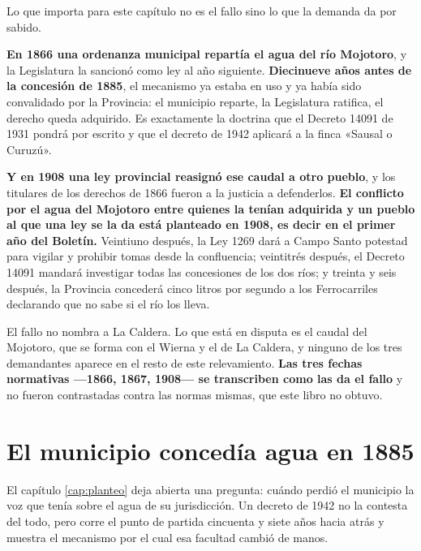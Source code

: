Lo que importa para este capítulo no es el fallo sino lo que la demanda da por sabido.

\textbf{En 1866 una ordenanza municipal repartía el agua del río Mojotoro}, y la Legislatura la
sancionó como ley al año siguiente. \textbf{Diecinueve años antes de la concesión de 1885}, el
mecanismo ya estaba en uso y ya había sido convalidado por la Provincia: el municipio reparte,
la Legislatura ratifica, el derecho queda adquirido. Es exactamente la doctrina que el Decreto
14091 de 1931 pondrá por escrito y que el decreto de 1942 aplicará a la finca «Sausal o
Curuzú».

\textbf{Y en 1908 una ley provincial reasignó ese caudal a otro pueblo}, y los titulares de los
derechos de 1866 fueron a la justicia a defenderlos. \textbf{El conflicto por el agua del
Mojotoro entre quienes la tenían adquirida y un pueblo al que una ley se la da está planteado
en 1908, es decir en el primer año del Boletín.} Veintiuno después, la Ley 1269 dará a Campo
Santo potestad para vigilar y prohibir tomas desde la confluencia; veintitrés después, el
Decreto 14091 mandará investigar todas las concesiones de los dos ríos; y treinta y seis
después, la Provincia concederá cinco litros por segundo a los Ferrocarriles declarando que no
sabe si el río los lleva.

\begin{cautela}
El fallo no nombra a La Caldera. Lo que está en disputa es el caudal del Mojotoro, que se forma
con el Wierna y el de La Caldera, y ninguno de los tres demandantes aparece en el resto de este
relevamiento. \textbf{Las tres fechas normativas ---1866, 1867, 1908--- se transcriben como las
da el fallo} y no fueron contrastadas contra las normas mismas, que este libro no obtuvo.
\end{cautela}

\section{El municipio concedía agua en 1885}

El capítulo \ref{cap:planteo} deja abierta una pregunta: cuándo perdió el municipio la voz que tenía sobre el
agua de su jurisdicción. Un decreto de 1942 no la contesta del todo, pero corre el punto de
partida cincuenta y siete años hacia atrás y muestra el mecanismo por el cual esa facultad
cambió de manos.


